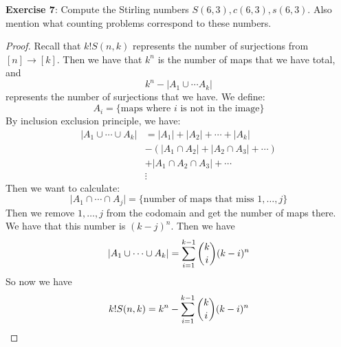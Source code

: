 \documentclass{article}
\begin{document}
\textbf{Exercise 7}: Compute the Stirling numbers $S(6, 3), c(6, 3), s(6, 3)$. Also mention what counting problems correspond to these numbers.
    \begin{proof}
        Recall that $k!S(n, k)$ represents the number of surjections from $[n] \rightarrow [k]$. Then we have that $k^{n}$ is the number of maps that we have total, and 
            \begin{equation*}
                k^{n} - \lvert A_{1} \cup \cdots A_{k} \rvert
            \end{equation*}
        represents the number of surjections that we have. We define:
            \begin{equation*}
                A_{i} = \{\text{maps where $i$ is not in the image}\}
            \end{equation*}
        By inclusion exclusion principle, we have:
            \begin{align*}
                \lvert A_{1} \cup \cdots \cup A_{k} \rvert &=      \lvert A_{1} \rvert + \lvert A_{2} \rvert + \cdots + \lvert A_{k} \rvert   \\
                                                           &-      (\lvert A_{1} \cap A_{2} \rvert + \lvert A_{2} \cap A_{3} \rvert + \cdots) \\
                                                           &+      \lvert A_{1} \cap A_{2} \cap A_{3} \rvert + \cdots                         \\
                                                           &\vdots                                                                              
            \end{align*}
        Then we want to calculate:
            \begin{equation*}
                \lvert A_{1} \cap \cdots \cap A_{j} \rvert = \{\text{number of maps that miss $1, \ldots, j$}\}
            \end{equation*}
        Then we remove $1, \ldots, j$ from the codomain and get the number of maps there. We have that this number is $(k - j)^{n}$. Then we have
            \begin{equation*}
                \lvert A_{1} \cup \cdots \cup A_{k} \rvert = \sum_{i = 1}^{k - 1}\dbinom{k}{i}(k - i)^{n}
            \end{equation*}
        So now we have
            \begin{equation*}
                k!S(n, k) = k^{n} - \sum_{i = 1}^{k - 1}\dbinom{k}{i}(k - i)^{n}
            \end{equation*}

\end{proof}
\end{document}

